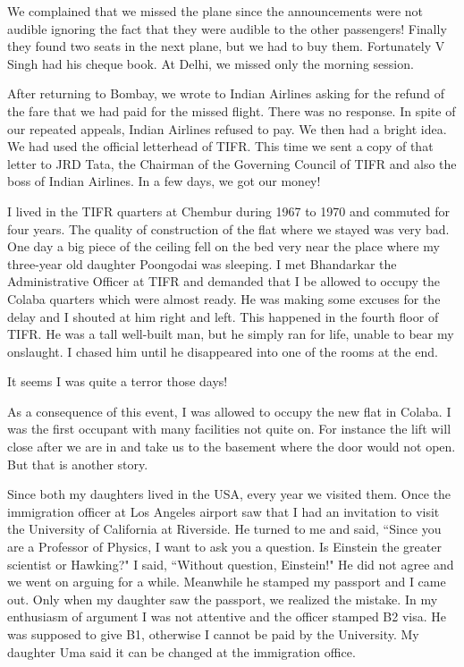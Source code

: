 We complained that we missed the plane since the annou\-ncements were not 
audible ignoring the fact that they were audible to the other 
passengers! Finally they found two seats in the next plane, but we had 
to buy them. Fortunately V Singh had his cheque book. At Delhi, we 
missed only the morning session.


After returning to Bombay, we wrote to Indian Airlines as\-king for the 
refund of the fare that we had paid for the missed flight. There was no 
response. In spite of our repeated appeals, Indian Airlines refused to 
pay. We then had a bright idea. We had used the official letterhead of 
TIFR. This time we sent a copy of that letter to JRD Tata, the Chairman 
of the Governing Council of TIFR and also the boss of Indian Airlines. 
In a few days, we got our money!


I lived in the TIFR quarters at Chembur during 1967 to 1970 and commuted 
for four years. The quality of construction of the flat where we stayed 
was very bad. One day a big piece of the ceiling fell on the bed very 
near the place where my three-year old daughter Poongodai was sleeping. 
I met Bhandarkar the Administrative Officer at TIFR and demanded that I 
be allowed to occupy the Colaba quarters which were almost ready. He was 
making some excuses for the delay and I shouted at him right and left. 
This happened in the fourth floor of TIFR. He was a tall well-built man, 
but he simply ran for life, unable to bear my onslaught. I chased him 
until he disappeared into one of the rooms at the end.

It seems I was quite a terror those days!

As a consequence of this event, I was allowed to occupy the new flat in 
Colaba. I was the first occupant with many facilities not quite on. For 
instance the lift will close after we are in and take us to the basement 
where the door would not open. But that is another story.

Since both my daughters lived in the USA, every year we visi\-ted them. 
Once the immigration officer at Los Angeles airport saw that I had an 
invitation to visit the University of California at Riverside. He turned 
to me and said, ``Since you are a Professor of Physics, I want to ask you 
a question. Is Einstein the greater scientist or Hawking?" I 
said, ``Without question, Einstein!" He did not agree and we went on 
arguing for a while. Meanwhile he stamped my passport and I came out. 
Only when my daughter saw the passport, we realized the mistake. In my 
enthusiasm of argument I was not attentive and the officer stamped B2 
visa. He was supposed to give B1, otherwise I cannot be paid by the 
University. My daughter Uma said it can be changed at the immi\-gration 
office.

